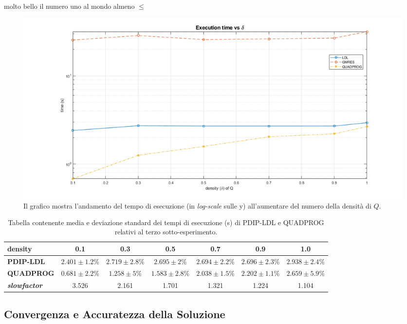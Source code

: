 molto bello il numero uno al mondo almeno $\leq$

\begin{figure}[h]
    \centering
    \includegraphics[width=\textwidth]{img/MU4.png}
    \caption{Il grafico mostra l'andamento del tempo di esecuzione (in \textit{log-scale} sulle y) all'aumentare del numero della densità di $Q$. \label{fig:exp1}}
\end{figure}
 


\begin{table}[!h]
\centering
\begin{tabular}{l|c|c|c|c|c|c}
\textbf{density}                     & \textbf{0.1} & \textbf{0.3} & \textbf{0.5} & \textbf{0.7} & \textbf{0.9} & \textbf{1.0} \\ \hline
\textbf{PDIP-LDL}                    & $2.401 \pm 1.2\%$       & $2.719 \pm 2.8\%$       & $2.695  \pm 2\%$       & $2.694 \pm 2.2\%$       & $2.696 \pm 2.3\%$       & $2.938  \pm 2.4\%$       \\
\textbf{QUADPROG}                    & $0.681  \pm 2.2\%$      & $1.258  \pm 5\%$       & $1.583 \pm 2.8\%$       & $2.038 \pm 1.5\%$       & $2.202 \pm 1.1\%$       & $2.659 \pm 5.9\%$       \\
\textbf{\textit{slowfactor}} & 3.526       & 2.161       & 1.701       & 1.321       & 1.224       & 1.104
\end{tabular}
\caption{Tabella contenente media e deviazione standard dei tempi di esecuzione (s) di PDIP-LDL e QUADPROG relativi al terzo sotto-esperimento. \label{tab:ldlqp3}}
\end{table}


\subsection*{Convergenza e Accuratezza della Soluzione}

